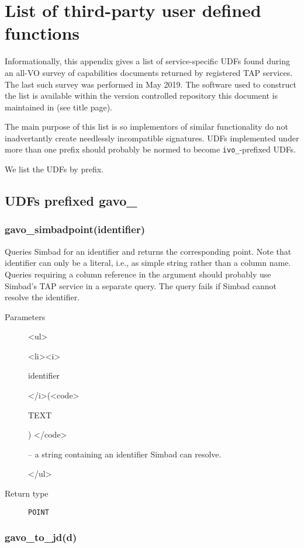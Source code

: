 \documentclass[11pt,a4paper]{ivoa}
\newenvironment{args}%
{\begin{html}<ul>\end{html}\def\arg##1(##2){\begin{html}<li><i>\end{html}%
  ##1 \begin{html}</i>(<code>\end{html}##2\begin{html}) </code>\end{html}}}%
{\begin{html}</ul>\end{html}}
\newenvironment{args}%
  {\hfil %
    \def\arg##1(##2){\item {\textit{##1} (\texttt{##2})}}
    \begin{list}{$\bullet$}{\topsep=0pt\partopsep=0pt\parsep=0pt}
    }%
  {\end{list}}
\begin{document}
\appendix

\section{List of third-party user defined functions}

Informationally, this appendix gives a list of service-specific UDFs
found during an all-VO survey of capabilities documents returned by
registered TAP services.  The last such survey was performed in May
2019.  The software used to construct the list is available within the
version controlled repository this document is maintained in (see title
page).

The main purpose of this list is so implementors of similar
functionality do not inadvertantly create needlessly incompatible
signatures.  UDFs implemented under more than one prefix should probably
be normed to become \verb|ivo_|-prefixed UDFs.

We list the UDFs by prefix.

\subsection{UDFs prefixed gavo\_}

\subsubsection{gavo\_simbadpoint(identifier)}

Queries Simbad for an identifier and returns the corresponding point.
Note that identifier can only be a literal, i.e., as simple string
rather than a column name.  Queries requiring a column reference in the
argument should probably use Simbad's TAP service in a separate query.
The query fails if Simbad cannot resolve the identifier.

\begin{description}
\item[Parameters]
\begin{args}
	\arg identifier (TEXT) -- a string containing an identifier Simbad can
	resolve.
\end{args}

\item[Return type] \texttt{POINT}
\end{description}

\subsubsection{gavo\_to\_jd(d)}
\end{document}
